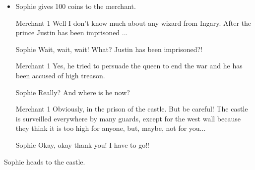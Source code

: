 \begin{itemize}
\begin{itemize}
\begin{screenplay}
    Sophie goes away disconsolate.
    
\begin{dialogue}{Sophie}
I saw on the map there is another square in front of the castle, maybe we'll have better luck there.
\end{dialogue}

\end{screenplay}

  \item Sophie gives 100 coins to the merchant.
    
\begin{screenplay}

\begin{dialogue}{Merchant 1}
Well I don't know much about any wizard from Ingary. After the prince Justin has been imprisoned ...
\end{dialogue}

\begin{dialogue}[incredulous]{Sophie}
Wait, wait, wait! What? Justin has been imprisoned?!
\end{dialogue}
    
\begin{dialogue}{Merchant 1}
Yes, he tried to persuade the queen to end the war and he has been accused of high treason.
\end{dialogue}
    
\begin{dialogue}{Sophie}
Really? And where is he now?
\end{dialogue}
    
\begin{dialogue}{Merchant 1}
Obviously, in the prison of the castle. But be careful! The castle is surveilled everywhere by many guards, except for the west wall because they think it is too high for anyone, but, maybe, not for you...
\end{dialogue}
    
\begin{dialogue}[hasty]{Sophie}
Okay, okay thank you! I have to go!!
\end{dialogue}

\end{screenplay}

  \end{itemize}

\end{itemize}

\vspace{1em}

Sophie heads to the castle.

